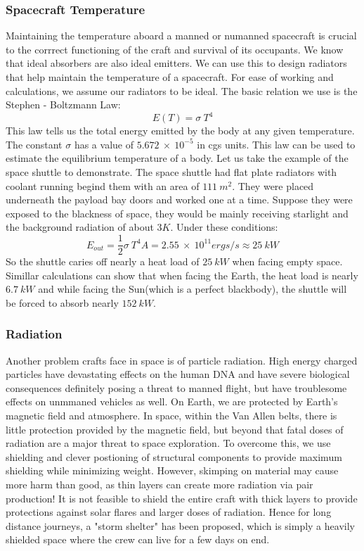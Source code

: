 \documentclass[12pt, letterpaper]{article}
\begin{document}
\subsubsection{Spacecraft Temperature}
Maintaining the temperature aboard a manned or numanned spacecraft is crucial to the corrrect functioning of the craft and survival of its occupants. We know that ideal absorbers are also ideal emitters. We can use this to design radiators that help maintain the temperature of a spacecraft. For ease of working and calculations, we assume our radiators to be ideal. The basic relation we use is the Stephen - Boltzmann Law:
\[
	E(T) = \sigma \:T^4 
\]
This law tells us the total energy emitted by the body at any given temperature. The constant $\sigma$ has a value of $5.672 \: \times \: 10^{-5} $ in cgs units. This law can be used to estimate the equilibrium temperature of a body. Let us take the example of the space shuttle to demonstrate. The space shuttle had flat plate radiators with coolant running begind them with an area of $111\: m^2$.
They were placed underneath the payload bay doors and worked one at a time. Suppose they were exposed to the blackness of space, they would be mainly receiving starlight and the background radiation of about $3K$. Under these conditions:
\[
	E_{out} = \frac{1}{2}\sigma \:T^4 A= 2.55\: \times \: 10^{11} ergs/s \approx 25\:kW
\] 
So the shuttle caries off nearly a heat load of $25\:kW$ when facing empty space. Simillar calculations can show that when facing the Earth, the heat load is nearly $6.7\:kW$ and while facing the Sun(which is a perfect blackbody), the shuttle will be forced to absorb nearly $152\:kW$.

\subsubsection{Radiation}

Another problem crafts face in space is of particle radiation. High energy charged particles have devastating effects on the human DNA and have severe biological consequences definitely posing a threat to manned flight, but have troublesome effects on unmmaned vehicles as well. On Earth, we are protected by Earth's magnetic field and atmosphere. In space, within the Van Allen belts, there is little protection provided by the magnetic field, but beyond that fatal doses of radiation are a major threat to space exploration. To overcome this, we use shielding and clever postioning of structural components to provide maximum shielding while minimizing weight. However, skimping on material may cause more harm than good, as thin layers can create more radiation via pair production! It is not feasible to shield the entire craft with thick layers to provide protections against solar flares and larger doses of radiation. Hence for long distance journeys, a "storm shelter" has been proposed, which is simply a heavily shielded space where the crew can live for a few days on end. 
\end{document}
